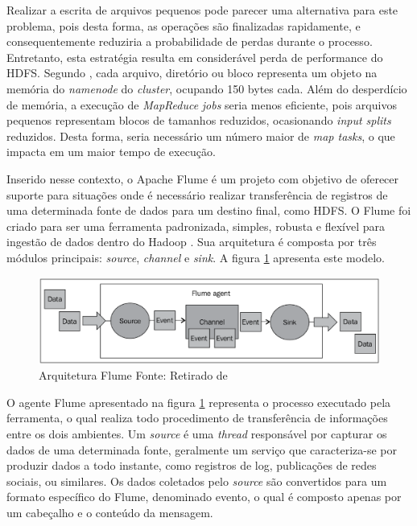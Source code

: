 Realizar a escrita de arquivos pequenos pode parecer uma alternativa para este problema, pois desta forma, as operações são finalizadas rapidamente, e consequentemente reduziria a probabilidade de perdas durante o processo. Entretanto, esta estratégia resulta em considerável perda de performance do HDFS. Segundo , cada arquivo, diretório ou bloco representa um objeto na memória do \textit{namenode} do \textit{cluster}, ocupando 150 bytes cada. Além do desperdício de memória, a execução de \textit{MapReduce} \textit{jobs} seria menos eficiente, pois arquivos pequenos representam blocos de tamanhos reduzidos, ocasionando \textit{input splits} reduzidos. Desta forma, seria necessário um número maior de \textit{map tasks}, o que impacta em um maior tempo de execução.

Inserido nesse contexto, o Apache Flume é um projeto com objetivo de oferecer suporte para situações onde é necessário realizar transferência de registros de uma determinada fonte de dados para um destino final, como HDFS. O Flume foi criado para ser uma ferramenta padronizada, simples, robusta e flexível para ingestão de dados dentro do Hadoop \cite{hoffmanFlume}. Sua arquitetura é composta por três módulos principais: \textit{source}, \textit{channel} e \textit{sink}. A figura \ref{flume-arch} apresenta este modelo.

\begin{figure}[ht!]
	\centering
	\includegraphics[keepaspectratio=true,scale=0.4]
	  {figuras/flume.eps}
	\caption[Arquitetura Flume]{Arquitetura Flume
	\protect\linebreak Fonte: Retirado de \cite{hoffmanFlume}}
	\label{flume-arch}
\end{figure}
\FloatBarrier

O agente Flume apresentado na figura \ref{flume-arch} representa o processo executado pela ferramenta, o qual realiza todo procedimento de transferência de informações entre os dois ambientes. Um \textit{source} é uma \textit{thread} responsável por capturar os dados de uma determinada fonte, geralmente um serviço que caracteriza-se por produzir dados a todo instante, como registros de log, publicações de redes sociais, ou similares. Os dados coletados pelo \textit{source} são convertidos para um formato específico do Flume, denominado evento, o qual é composto apenas por um cabeçalho e o conteúdo da mensagem.

